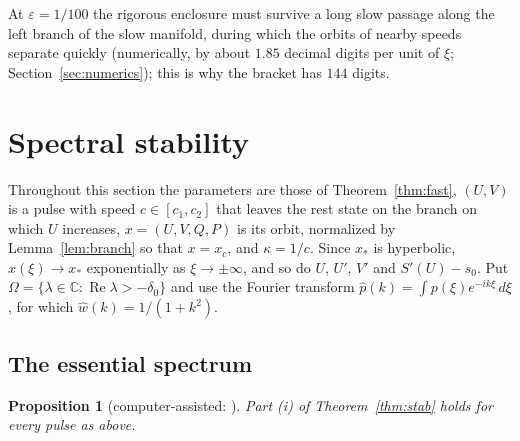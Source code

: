 \documentclass[11pt]{article}
\newtheorem{proposition}[lemma]{Proposition}
\theoremstyle{definition}
\newcommand{\C}{\mathbb{C}}
\newcommand{\eps}{\varepsilon}
\newcommand{\re}{\operatorname{Re}}
\newcommand{\xs}{x_*}
\newcommand{\dz}{\delta_0}
\begin{document}
At $\eps = 1/100$ the rigorous enclosure must survive a long slow passage along the left branch of the slow manifold, during which the orbits of nearby speeds separate quickly (numerically, by about $1.85$ decimal digits per unit of $\xi$; Section~\ref{sec:numerics}); this is why the bracket has $144$ digits.

\section{Spectral stability}\label{sec:stability}

Throughout this section the parameters are those of Theorem~\ref{thm:fast}, $(U, V)$ is a pulse with speed $c \in [c_1, c_2]$ that leaves the rest state on the branch on which $U$ increases, $x = (U, V, Q, P)$ is its orbit, normalized by Lemma~\ref{lem:branch} so that $x = x_c$, and $\kappa = 1/c$. Since $\xs$ is hyperbolic, $x(\xi) \to \xs$ exponentially as $\xi \to \pm\infty$, and so do $U$, $U'$, $V'$ and $S'(U) - s_0$. Put $\Omega = \{\lambda \in \C : \re\lambda > -\dz\}$ and use the Fourier transform $\hat p(k) = \int p(\xi)e^{-ik\xi}\, d\xi$, for which $\hat w(k) = 1/(1 + k^2)$.

\subsection{The essential spectrum}

\begin{proposition}[computer-assisted: ]\label{prop:ess}
Part (i) of Theorem~\ref{thm:stab} holds for every pulse as above.
\end{proposition}
\end{document}
